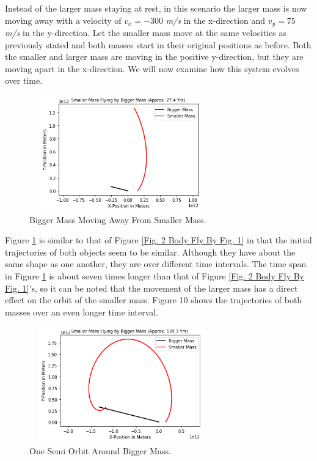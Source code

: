 \documentclass[twocolumn]{article}
\begin{document}
Instead of the larger mass staying at rest, in this scenario the larger mass is now moving away with a velocity of $v_{x}=-300$ \textit{m/s} in the x-direction and $v_{y}=75$ \textit{m/s} in the y-direction. Let the smaller mass move at the same velocities as previously stated and both masses start in their original positions as before. Both the smaller and larger mass are moving in the positive y-direction, but they are moving apart in the x-direction. We will now examine how this system evolves over time.
\begin{figure}[ht]
    \centering
    \includegraphics[width=8cm, height=5cm]{Figures/2-Body Fly By (3).png}
    \caption{\small{Bigger Mass Moving Away From Smaller Mass.}}
    \label{Fig. 2 Body Fly By Fig. 3}
\end{figure}
\par \noindent
Figure \ref{Fig. 2 Body Fly By Fig. 3} is similar to that of Figure \ref{Fig. 2 Body Fly By Fig. 1} in that the initial trajectories of both objects seem to be similar. Although they have about the same shape as one another, they are over different time intervals. The time span in Figure \ref{Fig. 2 Body Fly By Fig. 3} is about seven times longer than that of Figure \ref{Fig. 2 Body Fly By Fig. 1}'s, so it can be noted that the movement of the larger mass has a direct effect on the orbit of the smaller mass. Figure 10 shows the trajectories of both masses over an even longer time interval.
\begin{figure}[ht]
    \centering
    \includegraphics[width=8cm, height=5cm]{Figures/2-Body Fly By (4).png}
    \caption{\small{One Semi Orbit Around Bigger Mass.}}
    \label{Fig. 2 Body Fly By Fig. 4}
\end{figure}
\end{document}
